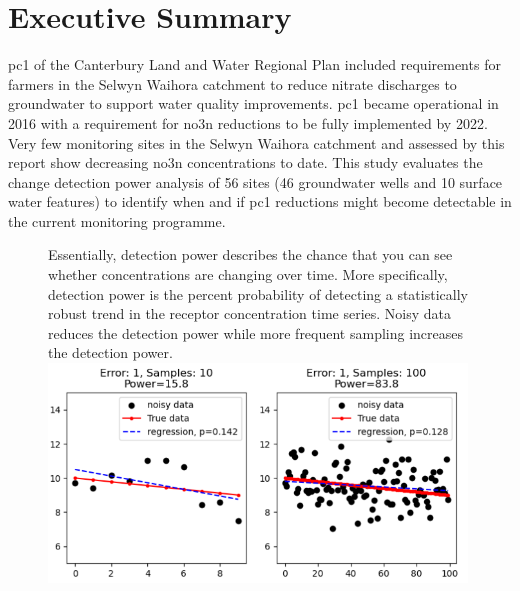 \newpage

\glsresetall  %
\section*{Executive Summary} \label{exsum} %


\gls{pc1} of the Canterbury Land and Water Regional Plan included requirements for farmers in the Selwyn Waihora catchment to reduce nitrate discharges to groundwater to support water quality improvements.
\gls{pc1} became operational in 2016 with a requirement for \gls{no3n} reductions to be fully implemented by 2022.
Very few monitoring sites in the Selwyn Waihora catchment and assessed by this report show decreasing \gls{no3n} concentrations to date.
This study evaluates the change detection power analysis of 56 sites (46 groundwater wells and 10 surface water features) to identify when and if \gls{pc1} reductions might become detectable in the current monitoring programme.

\begin{figure}
    \begin{breakawaybox}[title=What is Detection Power]{}

        Essentially, detection power describes the chance that you can see whether concentrations are changing over time.
        More specifically, detection power is the percent probability of detecting a statistically robust trend in the receptor concentration time series.
        Noisy data reduces the detection power while more frequent sampling increases the detection power.
        \\
        \includegraphics[width=0.99\textwidth]{figures/dp_ex_small}
    \end{breakawaybox}
\end{figure}


